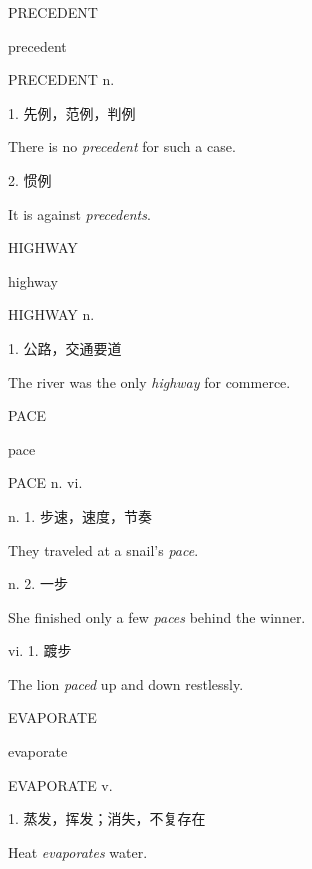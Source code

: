 \begin{flashcard}{
PRECEDENT

precedent
}
\begin{center}
PRECEDENT n. 
\end{center}
1. 先例，范例，判例

There is no \textit{precedent} for such a case.

2. 惯例

It is against \textit{precedents}.

\end{flashcard}
\begin{flashcard}{
HIGHWAY

highway
}
\begin{center}
HIGHWAY n. 
\end{center}
1. 公路，交通要道

The river was the only \textit{highway} for commerce.

\end{flashcard}
\begin{flashcard}{
PACE

pace
}
\begin{center}
PACE n. vi. \textipa{[peis]}
\end{center}
n. 1. 步速，速度，节奏

They traveled at a snail's \textit{pace}.

n. 2. 一步

She finished only a few \textit{paces} behind the winner.

vi. 1. 踱步

The lion \textit{paced} up and down restlessly.

\end{flashcard}
\begin{flashcard}{
EVAPORATE

evaporate
}
\begin{center}
EVAPORATE v. 
\end{center}
1. 蒸发，挥发；消失，不复存在

Heat \textit{evaporates} water.

\end{flashcard}
